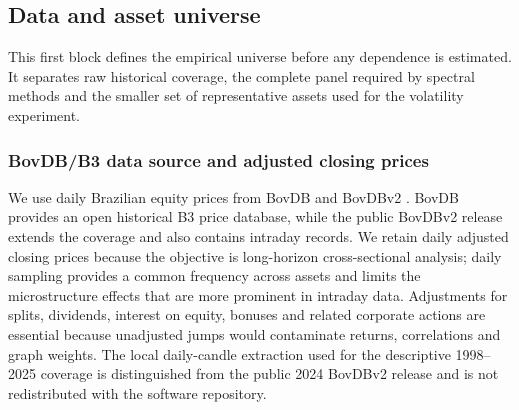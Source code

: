 \begin{center}
{%
}
\label{fig:methodology_overview}
\end{center}

\subsection{Data and asset universe}
\label{subsec:data_universe}

This first block defines the empirical universe before any dependence is estimated. It separates raw historical coverage, the complete panel required by spectral methods and the smaller set of representative assets used for the volatility experiment.

\subsubsection{BovDB/B3 data source and adjusted closing prices}
\label{subsec:bovdb_prices}

We use daily Brazilian equity prices from BovDB and BovDBv2 \cite{cardoso_2022_bovdb,souza_2024_bovdbv2}. BovDB provides an open historical B3 price database, while the public BovDBv2 release extends the coverage and also contains intraday records. We retain daily adjusted closing prices because the objective is long-horizon cross-sectional analysis; daily sampling provides a common frequency across assets and limits the microstructure effects that are more prominent in intraday data. Adjustments for splits, dividends, interest on equity, bonuses and related corporate actions are essential because unadjusted jumps would contaminate returns, correlations and graph weights. The local daily-candle extraction used for the descriptive 1998--2025 coverage is distinguished from the public 2024 BovDBv2 release and is not redistributed with the software repository.

